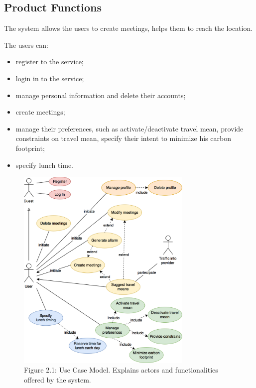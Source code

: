 \documentclass{article}
\begin{document}
	
	\subsection{Product Functions}
	The system allows the users to create meetings, helps them to reach the location.
	
	The users can:
	\begin{itemize}
		\item register to the service;
		\item login in to the service;
		\item manage personal information and delete their accounts;
		\item create meetings;
		\item manage their preferences, such as activate/deactivate travel mean, provide constraints on travel mean, specify their intent to minimize his carbon footprint;
		\item specify lunch time.
	\end{itemize}
	
	\bigskip
	\bigskip
	\begin{figure}[htbp]
		\begin{center}
		\includegraphics[width=0.75\textwidth]{img/diagrams/uc.png} \\ \bigskip
		Figure 2.1: Use Case Model. Explains actors and functionalities offered by the system.
		\label{default}
		\end{center}
	\end{figure}
	
\end{document}
